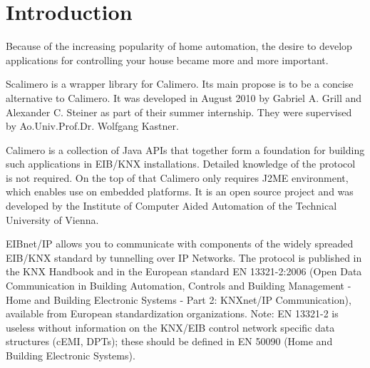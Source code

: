 \chapter{Introduction}

Because of the increasing popularity of home automation, the desire to develop applications for controlling your house became more and more important. 

Scalimero is a wrapper library for Calimero. Its main propose is to be a concise alternative to Calimero. It was developed in August 2010 by Gabriel A. Grill and Alexander C. Steiner as part of their summer internship. They were supervised by Ao.Univ.Prof.Dr. Wolfgang Kastner.

Calimero is a collection of Java APIs that together form a foundation for building such applications in EIB/KNX installations. Detailed knowledge of the protocol is not required. On the top of that Calimero only requires J2ME environment, which enables use on embedded platforms. It is an open source project and was developed by the Institute of Computer Aided Automation of the Technical University of Vienna.

EIBnet/IP allows you to communicate with components of the widely spreaded EIB/KNX standard by tunnelling over IP Networks. The protocol is published in the KNX Handbook and in the European standard EN 13321-2:2006 (Open Data Communication in Building Automation, Controls and Building Management - Home and Building Electronic Systems - Part 2: KNXnet/IP Communication), available from European standardization organizations. Note: EN 13321-2 is useless without information on the KNX/EIB control network specific data structures (cEMI, DPTs); these should be defined in EN 50090 (Home and Building Electronic Systems).

